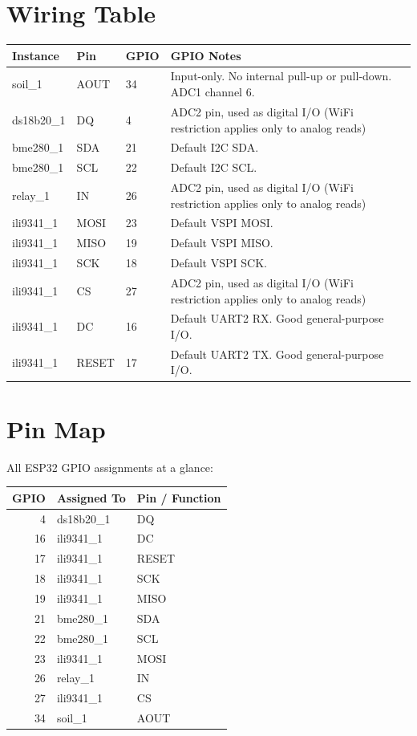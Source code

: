 \documentclass[a4paper,11pt]{article}
\begin{document}
\section{Wiring Table}

\begin{longtable}{p{2.5cm}p{2cm}p{1.5cm}p{7.5cm}}
\toprule
\textbf{Instance} & \textbf{Pin} & \textbf{GPIO} & \textbf{GPIO Notes} \\
\midrule
\endhead
\bottomrule
\endfoot
soil\_1 & AOUT & 34 & Input-only. No internal pull-up or pull-down. ADC1 channel 6. \\
\midrule
ds18b20\_1 & DQ & 4 & ADC2 pin, used as digital I/O (WiFi restriction applies only to analog reads) \\
\midrule
bme280\_1 & SDA & 21 & Default I2C SDA. \\
bme280\_1 & SCL & 22 & Default I2C SCL. \\
\midrule
relay\_1 & IN & 26 & ADC2 pin, used as digital I/O (WiFi restriction applies only to analog reads) \\
\midrule
ili9341\_1 & MOSI & 23 & Default VSPI MOSI. \\
ili9341\_1 & MISO & 19 & Default VSPI MISO. \\
ili9341\_1 & SCK & 18 & Default VSPI SCK. \\
ili9341\_1 & CS & 27 & ADC2 pin, used as digital I/O (WiFi restriction applies only to analog reads) \\
ili9341\_1 & DC & 16 & Default UART2 RX. Good general-purpose I/O. \\
ili9341\_1 & RESET & 17 & Default UART2 TX. Good general-purpose I/O. \\
\midrule
\end{longtable}

\section{Pin Map}

All ESP32 GPIO assignments at a glance:

\begin{center}
\begin{tabular}{rll}
\toprule
\textbf{GPIO} & \textbf{Assigned To} & \textbf{Pin / Function} \\
\midrule
4 & ds18b20\_1 & DQ \\
16 & ili9341\_1 & DC \\
17 & ili9341\_1 & RESET \\
18 & ili9341\_1 & SCK \\
19 & ili9341\_1 & MISO \\
21 & bme280\_1 & SDA \\
22 & bme280\_1 & SCL \\
23 & ili9341\_1 & MOSI \\
26 & relay\_1 & IN \\
27 & ili9341\_1 & CS \\
34 & soil\_1 & AOUT \\
\bottomrule
\end{tabular}
\end{center}
\end{document}

